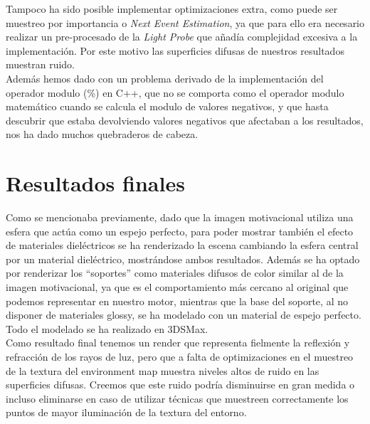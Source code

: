 \documentclass[10pt,oneside,a4paper]{article}
\begin{document}
Tampoco ha sido posible implementar optimizaciones extra, como puede ser muestreo por importancia o \emph{Next Event Estimation}, ya que para ello era necesario realizar un pre-procesado de la \emph{Light Probe} que añadía complejidad excesiva a la implementación. Por este motivo las superficies difusas de nuestros resultados muestran ruido.\\

Además hemos dado con un problema derivado de la implementación del operador modulo (\%) en C++, que no se comporta como el operador modulo matemático cuando se calcula el modulo de valores negativos, y que hasta descubrir que estaba devolviendo valores negativos que afectaban a los resultados, nos ha dado muchos quebraderos de cabeza.

\newpage
\section{Resultados finales}
Como se mencionaba previamente, dado que la imagen motivacional utiliza una esfera que actúa como un espejo perfecto, para poder mostrar también el efecto de materiales dieléctricos se ha renderizado la escena cambiando la esfera central por un material dieléctrico, mostrándose ambos resultados. Además se ha optado por renderizar los ``soportes'' como materiales difusos de color similar al de la imagen motivacional, ya que es el comportamiento más cercano al original que podemos representar en nuestro motor, mientras que la base del soporte, al no disponer de materiales glossy, se ha modelado con un material de espejo perfecto. Todo el modelado se ha realizado en 3DSMax.\\

Como resultado final tenemos un render que representa fielmente la reflexión y refracción de los rayos de luz, pero que a falta de optimizaciones en el muestreo de la textura del environment map muestra niveles altos de ruido en las superficies difusas. Creemos que este ruido podría disminuirse en gran medida o incluso eliminarse en caso de utilizar técnicas que muestreen correctamente los puntos de mayor iluminación de la textura del entorno.
\end{document}
